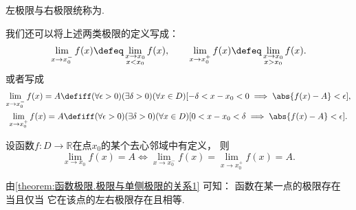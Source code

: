 左极限与右极限统称为.

\begin{remark}
我们还可以将上述两类极限的定义写成：\begin{gather*}
	\lim_{x \to x_0^-} f(x)
	\defeq
	\lim_{\substack{x \to x_0 \\ x < x_0}} f(x), \qquad
	\lim_{x \to x_0^+} f(x)
	\defeq
	\lim_{\substack{x \to x_0 \\ x > x_0}} f(x).
\end{gather*}
或者写成\begin{gather*}
	\lim_{x \to x_0^-} f(x) = A
	\defiff
	(\forall \epsilon > 0)
	(\exists \delta > 0)
	(\forall x \in D)
	[-\delta < x - x_0 < 0 \implies \abs{f(x) - A} < \epsilon], \\
	\lim_{x \to x_0^+} f(x) = A
	\defiff
	(\forall \epsilon > 0)
	(\exists \delta > 0)
	(\forall x \in D)
	[0 < x - x_0 < \delta \implies \abs{f(x) - A} < \epsilon].
\end{gather*}
\end{remark}

\begin{proposition}\label{theorem:函数极限.极限与单侧极限的关系1}
设函数\(f\colon D\to\mathbb{R}\)在点\(x_0\)的某个去心邻域中有定义，
则\begin{equation*}
	\lim_{x \to x_0} f(x) = A
	\iff
	\lim_{x \to x_0^-} f(x) = \lim_{x \to x_0^+} f(x) = A.
\end{equation*}
\end{proposition}
\begin{remark}
由\cref{theorem:函数极限.极限与单侧极限的关系1} 可知：
函数在某一点的极限存在
当且仅当
它在该点的左右极限存在且相等.
\end{remark}

